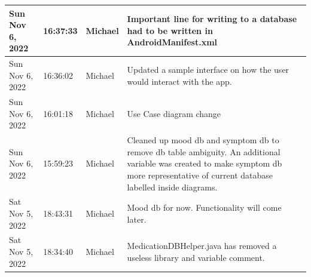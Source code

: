 \documentclass[11pt]{article}
\begin{document}
\begin{center}
\begin{longtable}{|p{2.7cm}|l|p{2cm}|p{8cm}|}
           \hline Sun Nov 6, 2022                            & 16:37:33                           & Michael                                 & Important line for writing to a database had to be written in AndroidManifest.xml                                                                                                                                                                                                                          \\
           \hline Sun Nov 6, 2022                            & 16:36:02                           & Michael                                 & Updated a sample interface on how the user would interact with the app.                                                                                                                                                                                                                                    \\
           \hline Sun Nov 6, 2022                            & 16:01:18                           & Michael                                 & Use Case diagram change                                                                                                                                                                                                                                                                                    \\
           \hline Sun Nov 6, 2022                            & 15:59:23                           & Michael                                 & Cleaned up mood db and symptom db to remove db table ambiguity. An additional variable was created to make symptom db more representative of current database labelled inside diagrams.                                                                                                                    \\
           \hline Sat Nov 5, 2022                            & 18:43:31                           & Michael                                 & Mood db for now. Functionality will come later.                                                                                                                                                                                                                                                            \\
           \hline Sat Nov 5, 2022                            & 18:34:40                           & Michael                                 & MedicationDBHelper.java has removed a useless library and variable comment.                                                                                                                                                                                                                                \\

\end{longtable}
\end{center}
\end{document}
